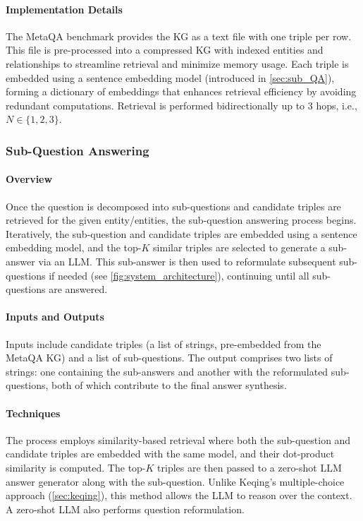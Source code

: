 \documentclass[pdflatex,sn-mathphys-num]{sn-jnl}%
\theoremstyle{thmstyleone}%
\theoremstyle{thmstyletwo}%
\theoremstyle{thmstylethree}%
\begin{document}
\paragraph{Implementation Details}  
The MetaQA benchmark provides the KG as a text file with one triple per row. This file is pre-processed into a compressed KG with indexed entities and relationships to streamline retrieval and minimize memory usage. Each triple is embedded using a sentence embedding model (introduced in \autoref{sec:sub_QA}), forming a dictionary of embeddings that enhances retrieval efficiency by avoiding redundant computations. Retrieval is performed bidirectionally up to 3 hops, i.e., $N \in \{1, 2, 3\}$.


\subsubsection{Sub-Question Answering}
\label{sec:sub_QA}

\paragraph{Overview}  
Once the question is decomposed into sub-questions and candidate triples are retrieved for the given entity/entities, the sub-question answering process begins. Iteratively, the sub-question and candidate triples are embedded using a sentence embedding model, and the top-$K$ similar triples are selected to generate a sub-answer via an LLM. This sub-answer is then used to reformulate subsequent sub-questions if needed (see \autoref{fig:system_architecture}), continuing until all sub-questions are answered.

\paragraph{Inputs and Outputs}  
Inputs include candidate triples (a list of strings, pre-embedded from the MetaQA KG) and a list of sub-questions. The output comprises two lists of strings: one containing the sub-answers and another with the reformulated sub-questions, both of which contribute to the final answer synthesis.

\paragraph{Techniques}  
The process employs similarity-based retrieval where both the sub-question and candidate triples are embedded with the same model, and their dot-product similarity is computed. The top-$K$ triples are then passed to a zero-shot LLM answer generator along with the sub-question. Unlike Keqing’s multiple-choice approach \cite{Wang2023} (\autoref{sec:keqing}), this method allows the LLM to reason over the context. A zero-shot LLM also performs question reformulation.
\end{document}
